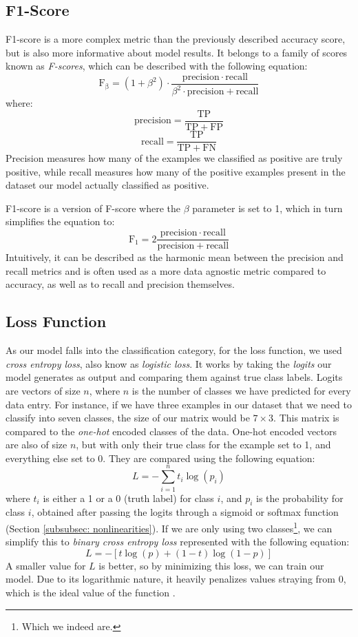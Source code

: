 \documentclass[times, utf8, diplomski, english]{fer_eng}
\begin{document}
\subsection{F1-Score}
\label{subsec:f1 score}

F1-score is a more complex metric than the previously described accuracy score, but is also more informative about model results. It belongs to a family of scores known as \textit{F-scores}, which can be described with the following equation:
\[ \mathrm{F_\beta} = (1 + \beta^2) \cdot \frac{\mathrm{precision} \cdot \mathrm{recall}}{\beta^2 \cdot \mathrm{precision} + \mathrm{recall}} \] where:
\[ \mathrm{precision} = \frac{\mathrm{TP}}{\mathrm{TP} + \mathrm{FP}} \]
\[ \mathrm{recall} = \frac{\mathrm{TP}}{\mathrm{TP} + \mathrm{FN}} \]
Precision measures how many of the examples we classified as positive are truly positive, while recall measures how many of the positive examples present in the dataset our model actually classified as positive.

F1-score is a version of F-score where the $\beta$ parameter is set to 1, which in turn simplifies the equation to:
\[ \mathrm{F_1} = 2 \frac{\mathrm{precision} \cdot \mathrm{recall}}{\mathrm{precision} + \mathrm{recall}} \]
Intuitively, it can be described as the harmonic mean between the precision and recall metrics and is often used as a more data agnostic metric compared to accuracy, as well as to recall and precision themselves.

\subsection{Loss Function}
\label{subsec:loss function}

As our model falls into the classification category, for the loss function, we used \textit{cross entropy loss}, also know as \textit{logistic loss}. It works by taking the \textit{logits} our model generates as output and comparing them against true class labels. Logits are vectors of size $n$, where $n$ is the number of classes we have predicted for every data entry. For instance, if we have three examples in our dataset that we need to classify into seven classes, the size of our matrix would be $7 \times 3$. This matrix is compared to the \textit{one-hot} encoded classes of the data. One-hot encoded vectors are also of size $n$, but with only their true class for the example set to 1, and everything else set to 0. They are compared using the following equation:
\[ L = - \sum_{i = 1}^n t_i \log (p_i) \]
where $t_i$ is either a 1 or a 0 (truth label) for class $i$, and $p_i$ is the probability for class $i$, obtained after passing the logits through a sigmoid or softmax function (Section \ref{subsubsec: nonlinearities}). If we are only using two classes\footnote{Which we indeed are.}, we can simplify this to \textit{binary cross entropy loss} represented with the following equation:
\[ L = - [t \log (p) + (1 - t) \log (1 - p)] \]
A smaller value for $L$ is better, so by minimizing this loss, we can train our model. Due to its logarithmic nature, it heavily penalizes values straying from 0, which is the ideal value of the function \cite{CEL}.
\end{document}
